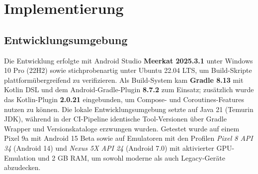 \documentclass[14pt,a4paper]{report}
\begin{document}
\chapter{Implementierung}

\section{Entwicklungsumgebung}
Die Entwicklung erfolgte mit Android Studio \textbf{Meerkat 2025.3.1} unter Windows 10 Pro (22H2) sowie stichprobenartig unter Ubuntu 22.04 LTS, um Build-Skripte plattformübergreifend zu verifizieren.
Als Build-System kam \textbf{Gradle 8.13} mit Kotlin DSL und dem Android-Gradle-Plugin \textbf{8.7.2} zum Einsatz; zusätzlich wurde das Kotlin-Plugin \textbf{2.0.21} eingebunden, um Compose- und Coroutines-Features nutzen zu können.
Die lokale Entwicklungsumgebung setzte auf Java 21 (Temurin JDK), während in der CI-Pipeline identische Tool-Versionen über Gradle Wrapper und Versionskataloge erzwungen wurden.
Getestet wurde auf einem Pixel 9a mit Android 15 Beta sowie auf Emulatoren mit den Profilen \textit{Pixel 8 API 34} (Android 14) und \textit{Nexus 5X API 24} (Android 7.0) mit aktivierter GPU-Emulation und 2 GB RAM, um sowohl moderne als auch Legacy-Geräte abzudecken.
\end{document}
